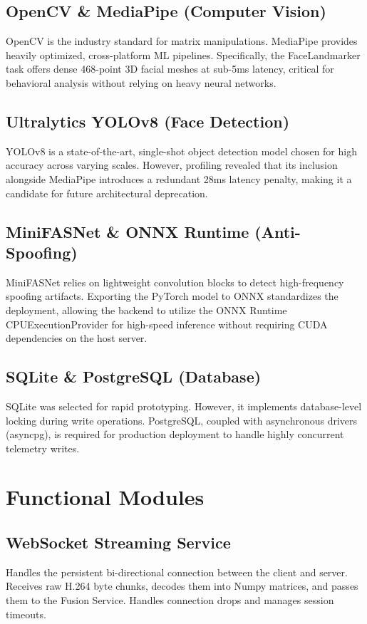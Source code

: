 \documentclass[12pt, a4paper]{report}
\begin{document}
\section{OpenCV \& MediaPipe (Computer Vision)}
OpenCV is the industry standard for matrix manipulations. MediaPipe provides heavily optimized, cross-platform ML pipelines. Specifically, the FaceLandmarker task offers dense 468-point 3D facial meshes at sub-5ms latency, critical for behavioral analysis without relying on heavy neural networks.

\section{Ultralytics YOLOv8 (Face Detection)}
YOLOv8 is a state-of-the-art, single-shot object detection model chosen for high accuracy across varying scales. However, profiling revealed that its inclusion alongside MediaPipe introduces a redundant 28ms latency penalty, making it a candidate for future architectural deprecation.

\section{MiniFASNet \& ONNX Runtime (Anti-Spoofing)}
MiniFASNet relies on lightweight convolution blocks to detect high-frequency spoofing artifacts. Exporting the PyTorch model to ONNX standardizes the deployment, allowing the backend to utilize the ONNX Runtime CPUExecutionProvider for high-speed inference without requiring CUDA dependencies on the host server.

\section{SQLite \& PostgreSQL (Database)}
SQLite was selected for rapid prototyping. However, it implements database-level locking during write operations. PostgreSQL, coupled with asynchronous drivers (asyncpg), is required for production deployment to handle highly concurrent telemetry writes.

\chapter{Functional Modules}

\section{WebSocket Streaming Service}
Handles the persistent bi-directional connection between the client and server. Receives raw H.264 byte chunks, decodes them into Numpy matrices, and passes them to the Fusion Service. Handles connection drops and manages session timeouts.
\end{document}
